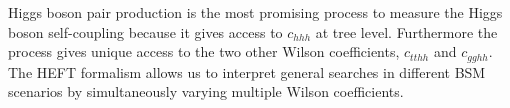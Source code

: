 Higgs boson pair production is the most promising process to measure the 
Higgs boson self-coupling because it gives access to $c_{hhh}$ at tree level.
Furthermore the \HH process gives unique access to 
the two other Wilson coefficients, $c_{tthh}$ and $c_{gghh}$.
The HEFT formalism allows us to interpret general searches in different BSM scenarios 
by simultaneously varying multiple Wilson coefficients. 








